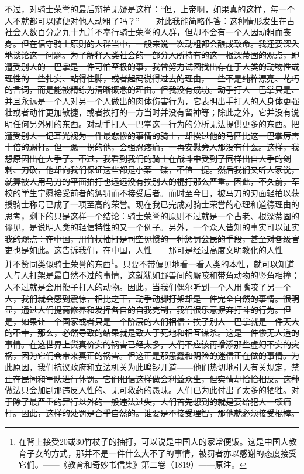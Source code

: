 \documentclass[12pt,oneside]{book}
\begin{document}
\sout{不过，对骑士荣誉的最后辩护无疑是这样：“但，上帝啊，如果真的这样，每一个人不就都可以随便对他人动粗了吗？”——对此我能简略作答：这种情形发生在占社会人数百分之九十九并不奉行骑士荣誉的人群，但却不会有一个人因动粗而丧身。但在信守骑士原则的人群当中，一般来说一次动粗都会酿成致命。我还要深入地谈论这一问题。为了解释人类社会的一部分人所持有的这一根深蒂固的观点，即遭受别人的一巴掌是一件可怕至极的事，我曾努力试图找出存在于人类的动物性或理性的一些扎实、站得住脚，或者起码说得过去的理由，一些不是纯粹漂亮、花巧的言词，而是能被精练为清晰概念的理由。但我没有成功。动手打人一巴掌只是、并且永远是一个人对另一个人做出的肉体伤害行为，它表明出手打人的人身体更强壮或者动作更加敏捷，或者挨打的一方当时并没有留神等；除此之外，它并没有说明任何另外别的东西。对动手打人一巴掌这一行为的分析无法提供更多的东西。把遭受别人一记耳光视为一件最悲惨的事情的骑士，却挨过他的马匹比这一巴掌厉害十倍的踢打。但一蹶一拐的他，会强忍疼痛，一再安慰旁人那没有什么。这样，我想原因出在人手了。不过，我看到我们的骑士在战斗中受到了同样出自人手的剑刺、刀砍，他却向我们保证这些都是小菜一碟，不值一提。然后我们又听人家说，就算被人用马刀的平面拍打也远远没有挨别人的棍打那么严重。因此，不久前，军校的学生宁愿接受前者的惩罚而不接受后者。而时至今日，被马刀的刃面轻拍以获授骑士称号已成了一项至高的荣誉。现在我已完成对骑士荣誉的心理和道德理由的思考，剩下的只是这样一个结论：骑士荣誉的原则不过就是一个古老、根深蒂固的谬见，是说明人类的轻信特性的又一个例子。另外，一个众人皆知的事实可以证实我的观点：在中国，用竹杖抽打是司空见惯的一种惩罚公民的手段，甚至对各级官吏也是如此。这告诉我们，在中国，人性——那可是经过高度文明教化的人性——并不赞同类似骑士荣誉的东西}\footnote{在背上接受20或30竹杖子的抽打，可以说是中国人的家常便饭。这是中国人教育子女的方式，那并不是一件什么大不了的事情，被罚者亦以感谢的态度接受它们。——《教育和奇妙书信集》第二卷（1819）——原注。}。\sout{只要不带偏见地看一看人类的本性，就可以知道人与人打架是最自然不过的事情，这就犹如野兽间的厮咬和带角动物的竖角相撞；人不过就是会用鞭子打人的动物。因此，当我们偶尔听到一个人用嘴咬了另一个人，我们就会感到震惊，相比之下，动手动脚打架却是一件完全自然的事情。很明显，通过人们提高修养和发挥各自的自我克制，我们很乐意摒弃打斗的行为。但是，如果让一个国家或者只是一个阶层的人们相信：挨了别人一巴掌就是一件天大的不幸，那么，必然导致的结果就是致人于死地和相互谋杀。这是一件惨无人道的事情。在这世界上货真价实的祸害已经太多，人们不应该再增添那些虚幻不实的灾祸，因为它们会带来真正的祸害。但这正是那愚蠢和阴险的迷信正在做的事情。为此原因，我们抗议政府和立法机关为此鸣锣开道——他们热切地引入有关规定，禁止在民间和军队进行体罚。它们相信这样做会利益众生，但实情却恰恰相反。这种做法只会加剧那违反人性的、无可救药的愚昧。人们已为此付出了太多的牺牲。对于除了最严重的罪行以外的一般违法过失，人们首先想到的就是要给犯人一顿痛打。因此，这样的处罚是合乎自然的。谁要是不接受理智，那他就必须接受棍棒。}
\end{document}
